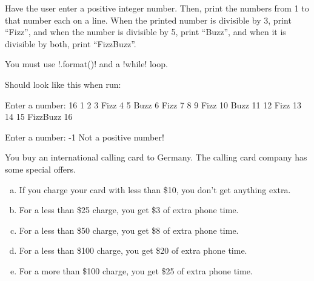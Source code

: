 \documentclass[11pt]{cselabheader}
\begin{document}
{\begin{ex}[fizzbuzz.py] Have the user enter a positive integer number. Then,
  print the numbers from 1 to that number each on a line. When the printed
  number is divisible by 3, print ``Fizz'', and when the number is divisible by
  5, print ``Buzz'', and when it is divisible by both, print ``FizzBuzz''.

  You must use \pythoninline!.format()! and a \pythoninline!while! loop.

  Should look like this when run:

  \begin{verbatimcode}
Enter a number: 16
1
2
3 Fizz
4
5 Buzz
6 Fizz
7
8
9 Fizz
10 Buzz
11
12 Fizz
13
14
15 FizzBuzz
16
  \end{verbatimcode}

  \begin{verbatimcode}
Enter a number: -1
Not a positive number!
  \end{verbatimcode}
\end{ex}



%
%
%

\begin{ex}[calls.py] You buy an international calling card to Germany. The
  calling card company has some special offers.

    \begin{enumerate}[(a)]
      \item If you charge your card with less than \$10, you don't get anything
        extra.
      \item For a less than \$25 charge, you get \$3 of extra phone time.
      \item For a less than \$50 charge, you get \$8 of extra phone time.
      \item For a less than \$100 charge, you get \$20 of extra phone time.
      \item For a more than \$100 charge, you get \$25 of extra phone time.
    \end{enumerate}


\end{ex}}
\end{document}
